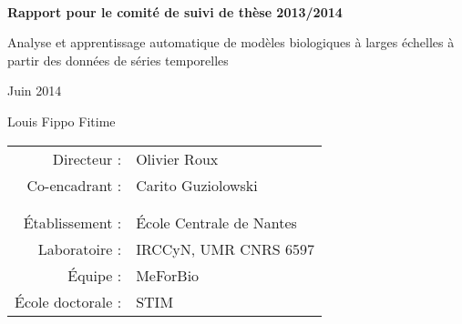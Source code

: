 
\thispagestyle{empty}

~
\vfill
{\Huge
\begin{center}
\textbf{Rapport pour le comité de suivi de thèse 2013/2014}

\vspace{1cm}

\LARGE
Analyse et apprentissage automatique de modèles biologiques à larges échelles à partir des données de séries temporelles

\vspace{2cm}

\normalsize
Juin 2014

\vspace{1cm}

\Large
Louis Fippo Fitime

\vspace{2cm}

\normalsize
\begin{tabular}{rl}
  Directeur :&Olivier Roux\\
  Co-encadrant :&Carito Guziolowski\\
  &\\
  &\\
  Établissement :&École Centrale de Nantes\\
  Laboratoire :&IRCCyN, UMR CNRS 6597\\
  Équipe :&MeForBio\\
  École doctorale :&STIM
\end{tabular}

\end{center}

\vspace{2cm}
}
